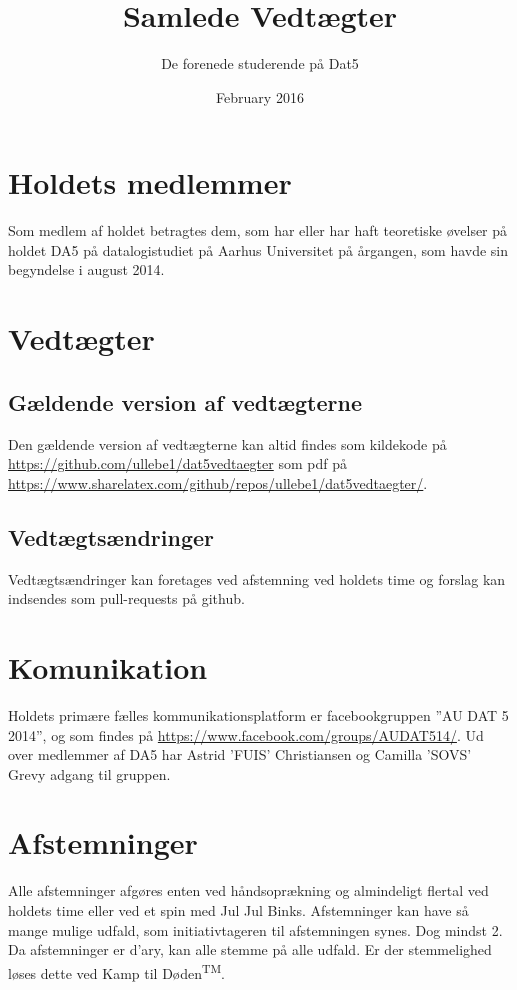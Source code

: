 \documentclass{article}
\title{Samlede Vedtægter}
\author{De forenede studerende på Dat5}
\date{February 2016}
\newcommand{\KTD}{Kamp til Døden\textsuperscript{TM}}
\newcommand{\JJB}{Jul Jul Binks}
\begin{document}
	\maketitle

	\section{Holdets medlemmer}
	Som medlem af holdet betragtes dem, som har eller har haft teoretiske øvelser på holdet DA5 på datalogistudiet på Aarhus Universitet på årgangen, som havde sin begyndelse i august 2014.

	\section{Vedtægter}
	\subsection{Gældende version af vedtægterne}
	Den gældende version af vedtægterne kan altid findes som kildekode på\\ \url{https://github.com/ullebe1/dat5vedtaegter} som pdf på\\ \url{https://www.sharelatex.com/github/repos/ullebe1/dat5vedtaegter/}.
	\subsection{Vedtægtsændringer}
	Vedtægtsændringer kan foretages ved afstemning ved holdets time og forslag kan indsendes som pull-requests på github.

	\section{Komunikation}
	Holdets primære fælles kommunikationsplatform er facebookgruppen ”AU DAT 5 2014”, og som findes på \url{https://www.facebook.com/groups/AUDAT514/}. Ud over medlemmer af DA5 har Astrid 'FUIS' Christiansen og Camilla 'SOVS' Grevy adgang til gruppen.

	\section{Afstemninger}
	Alle afstemninger afgøres enten ved håndsoprækning og almindeligt flertal ved holdets time eller ved et spin med \JJB. Afstemninger kan have så mange mulige udfald, som initiativtageren til afstemningen synes. Dog mindst 2. Da afstemninger er d'ary, kan alle stemme på alle udfald. Er der stemmelighed løses dette ved \KTD.
\end{document}
